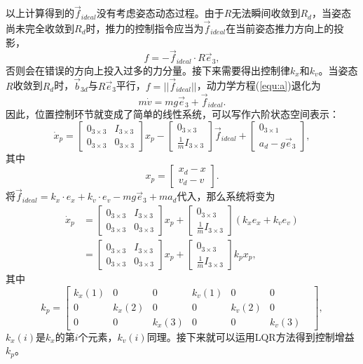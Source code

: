 以上计算得到的$\vec f_{ideal}$没有考虑姿态动态过程。由于$R$无法瞬间收敛到$R_d$，当姿态尚未完全收敛到$R_d$时，推力的控制指令应当为$\vec f_{ideal}$在当前姿态推力方向上的投影，
      $$f=-\vec f_{ideal}\cdot R \vec e_3,$$
否则会在错误的方向上投入过多的力分量。接下来需要得出控制律$k_x $和$ k_v$。当姿态$R$收敛到$R_d$时，$\vec b_{3d}$与$R \vec e_3$平行，$f=||\vec f_{ideal}||$，动力学方程(\ref{equ:a})退化为
      $$m \dot v=mg \vec e_3 + \vec f_{ideal}.$$
      因此，位置控制环节就变成了简单的线性系统，可以写作六阶状态空间表示：
      $$\dot x_p=\begin{bmatrix}
        0_{3\times 3} & I_{3\times 3} \\
        0_{3\times 3} & 0_{3\times 3}
    \end{bmatrix} x_p-\begin{bmatrix}
        0_{3\times 3} \\ \frac{1}{m} I_{3\times 3}
    \end{bmatrix} \vec f_{ideal} +\begin{bmatrix}
        0_{3 \times 1} \\ a_d-g \vec e_3 
    \end{bmatrix},$$
    其中
    $$x_p=\begin{bmatrix}
        x_d -x \\ v_d -v
    \end{bmatrix}.$$
将$\vec f_{ideal}=k_x \cdot e_x+k_v \cdot e_v-mg \vec e_3+m a_d$代入，那么系统将变为
$$
\begin{aligned}
  \dot x_p&=\begin{bmatrix}
    0_{3\times 3} & I_{3\times 3} \\
    0_{3\times 3} & 0_{3\times 3}
  \end{bmatrix} x_p+\begin{bmatrix}
    0_{3\times 3} \\ \frac{1}{m} I_{3\times 3}
  \end{bmatrix}(k_x e_x+k_v e_v)\\
  &=\begin{bmatrix}
    0_{3\times 3} & I_{3\times 3} \\
    0_{3\times 3} & 0_{3\times 3}
  \end{bmatrix} x_p+\begin{bmatrix}
    0_{3\times 3} \\ \frac{1}{m} I_{3\times 3}
  \end{bmatrix} k_p x_p,
\end{aligned}$$
其中
$$k_p=\begin{bmatrix}
  k_x(1) &0&0&k_v(1)&0&0\\
  0&k_x(2)&0&0&k_v(2)&0&\\
  0&0&k_x(3)&0&0&k_v(3)&
\end{bmatrix},$$
$k_x(i)$是$k_x$的第$i$个元素，$k_v(i)$同理。接下来就可以运用LQR方法得到控制增益$k_p$。

